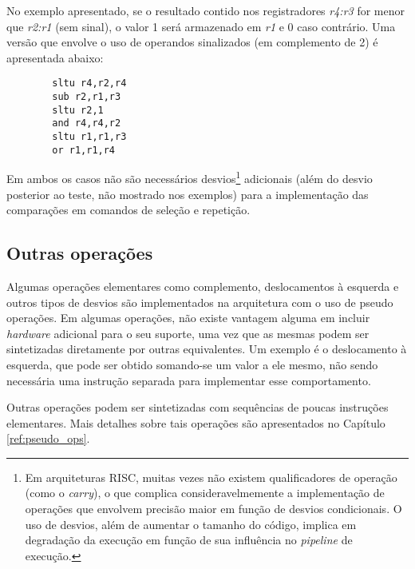 \documentclass{extreport}
\begin{document}
No exemplo apresentado, se o resultado contido nos registradores \textit{r4:r3} for menor que \textit{r2:r1} (sem sinal), o valor 1 será armazenado em \textit{r1} e 0 caso contrário.
Uma versão que envolve o uso de operandos sinalizados (em complemento de 2) é apresentada abaixo:

\begin{verbatim}
        sltu r4,r2,r4
        sub r2,r1,r3
        sltu r2,1
        and r4,r4,r2
        sltu r1,r1,r3
        or r1,r1,r4        
\end{verbatim}

Em ambos os casos não são necessários desvios\footnote{Em arquiteturas RISC, muitas vezes não existem qualificadores de operação (como o \textit{carry}), o que complica consideravelmemente a implementação de operações que envolvem precisão maior em função de desvios condicionais. O uso de desvios, além de aumentar o tamanho do código, implica em degradação da execução em função de sua influência no \textit{pipeline} de execução.} adicionais (além do desvio posterior ao teste, não mostrado nos exemplos) para a implementação das comparações em comandos de seleção e repetição.

\subsection{Outras operações}
Algumas operações elementares como complemento, deslocamentos à esquerda e outros tipos de desvios são implementados na arquitetura com o uso de pseudo operações. Em algumas operações, não existe vantagem alguma em incluir \textit{hardware} adicional para o seu suporte, uma vez que as mesmas podem ser sintetizadas diretamente por outras equivalentes. Um exemplo é o deslocamento à esquerda, que pode ser obtido somando-se um valor a ele mesmo, não sendo necessária uma instrução separada para implementar esse comportamento.

Outras operações podem ser sintetizadas com sequências de poucas instruções elementares. Mais detalhes sobre tais operações são apresentados no Capítulo \ref{ref:pseudo_ops}.
\end{document}
